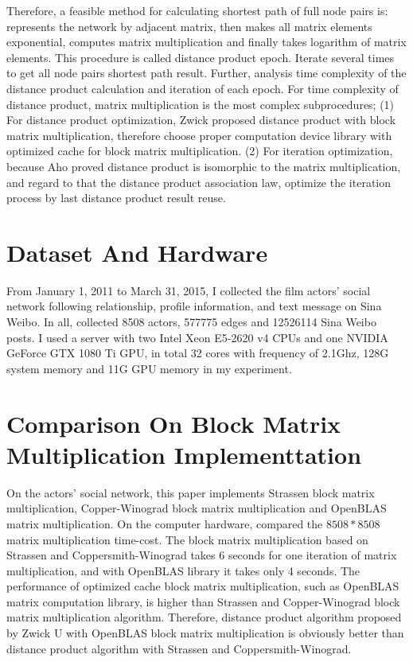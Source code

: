 \documentclass[review]{cvpr}
\begin{document}
Therefore, a feasible method for calculating shortest path of full node pairs is: represents the network by adjacent matrix, then makes all matrix elements exponential, computes matrix multiplication and finally takes logarithm of matrix elements.
This procedure is called distance product epoch.
Iterate several times to get all node pairs shortest path result.
Further, analysis time complexity of the distance product calculation and iteration of each epoch.
For time complexity of distance product, matrix multiplication is the most complex subprocedures;
(1) For distance product optimization, Zwick proposed distance product with block matrix multiplication, therefore choose proper computation device library with optimized cache for block matrix multiplication.
(2) For iteration optimization, because Aho proved distance product is isomorphic to the matrix multiplication, and regard to that the distance product association law, optimize the iteration process by last distance product result reuse.


\section{Dataset And Hardware}
From January 1, 2011 to March 31, 2015, I collected the film actors' social network following relationship, profile information, and text message on Sina Weibo.
In all, collected 8508 actors, 577775 edges and 12526114 Sina Weibo posts.
I used a server with two Intel Xeon E5-2620 v4 CPUs and one NVIDIA GeForce GTX 1080 Ti GPU, in total 32 cores with frequency of 2.1Ghz, 128G system memory and 11G GPU memory in my experiment.



\section{Comparison On Block Matrix Multiplication Implementtation}
On the actors' social network, this paper implements Strassen block matrix multiplication, Copper-Winograd block matrix multiplication and OpenBLAS matrix multiplication. On the computer hardware, compared the $8508*8508$ matrix multiplication time-cost.
The block matrix multiplication based on Strassen and Coppersmith-Winograd takes 6 seconds for one iteration of matrix multiplication, and with OpenBLAS library it takes only 4 seconds.
The performance of optimized cache block matrix multiplication, such as OpenBLAS matrix computation library, is higher than Strassen and Copper-Winograd block matrix multiplication algorithm.
Therefore, distance product algorithm proposed by Zwick U with OpenBLAS block matrix multiplication is obviously better than distance product algorithm with Strassen and Coppersmith-Winograd.
\end{document}
